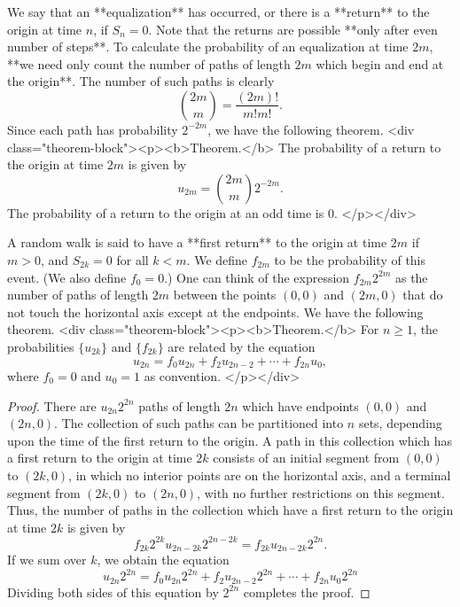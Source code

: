 We say that an **equalization** has occurred, or there is a **return** to the origin at time $n$, if $S_n = 0$. Note that the returns are possible **only after even number of steps**. To calculate
the probability of an equalization at time $2m$, **we need only count the number of paths of length $2m$ which begin and end at the origin**. The number of such paths is clearly
$$\begin{equation}
    \binom{2m}{m} = \frac{(2m)!}{m! m!}.
\end{equation}$$
Since each path has probability $2^{-2m}$, we have the following theorem.
<div class="theorem-block"><p><b>Theorem.</b> 
The probability of a return to the origin at time $2m$ is given by
$$\begin{equation}
    u_{2 m}= \binom{2m}{m} 2^{-2 m}.
\end{equation}$$
The probability of a return to the origin at an odd time is 0.
</p></div>

A random walk is said to have a **first return** to the origin at time $2m$ if $m > 0$, and $S_{2k} = 0$ for all $k < m$. We define $f_{2m}$ to be the probability of this event. (We also define $f_0 = 0$.) One can think
of the expression $f_{2m}2^{2m}$ as the number of paths of length $2m$ between the points $(0, 0)$ and $(2m, 0)$ that do not touch the horizontal axis except at the endpoints. We have the following theorem.
<div class="theorem-block"><p><b>Theorem.</b> 
For $n \geq 1$, the probabilities $\{u_{2k}\}$ and $\{f_{2k}\}$ are related by the equation
$$\begin{equation}
    u_{2 n}=f_{0} u_{2 n}+f_{2} u_{2 n-2}+\cdots+f_{2 n} u_{0},
\end{equation}$$
where $f_0 = 0$ and $u_0 = 1$ as convention.
</p></div>

\begin{proof}
There are $u_{2n}2^{2n}$ paths of length $2n$ which have endpoints $(0, 0)$ and $(2n, 0)$. The collection of such paths can be partitioned into $n$ sets, depending upon the time of the first return to the origin. A path in this collection which has a first return to the origin at time $2k$ consists of an initial segment from $(0, 0)$ to $(2k, 0)$, in which no interior points are on the horizontal axis, and a terminal segment from $(2k, 0)$
to $(2n, 0)$, with no further restrictions on this segment. Thus, the number of paths in the collection which have a first return to the origin at time $2k$ is given by
$$\begin{equation}
    f_{2 k} 2^{2 k} u_{2 n-2 k} 2^{2 n-2 k}=f_{2 k} u_{2 n-2 k} 2^{2 n}.
\end{equation}$$
If we sum over $k$, we obtain the equation
$$\begin{equation}
    u_{2 n} 2^{2 n}=f_{0} u_{2 n} 2^{2 n}+f_{2} u_{2 n-2} 2^{2 n}+\cdots+f_{2 n} u_{0} 2^{2 n}
\end{equation}$$
Dividing both sides of this equation by $2^{2n}$ completes the proof.
\end{proof}

